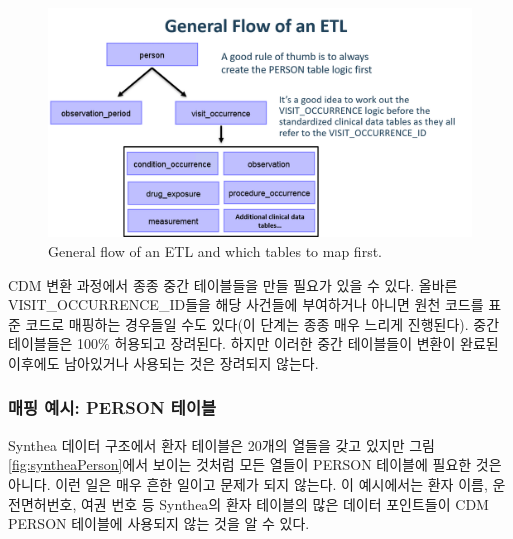 \documentclass[11pt]{book}
\theoremstyle{definition}
\theoremstyle{definition}
\theoremstyle{definition}
\theoremstyle{remark}
\begin{document}
\begin{figure}

{\centering \includegraphics[width=1\linewidth]{images/ExtractTransformLoad/flowOfEtl} 

}

\caption{General flow of an ETL and which tables to map first.}\label{fig:etlFlow}
\end{figure}

CDM 변환 과정에서 종종 중간 테이블들을 만들 필요가 있을 수 있다. 올바른
VISIT\_OCCURRENCE\_ID들을 해당 사건들에 부여하거나 아니면 원천 코드를
표준 코드로 매핑하는 경우들일 수도 있다(이 단계는 종종 매우 느리게
진행된다). 중간 테이블들은 100\% 허용되고 장려된다. 하지만 이러한 중간
테이블들이 변환이 완료된 이후에도 남아있거나 사용되는 것은 장려되지
않는다.

\subsubsection*{매핑 예시: PERSON 테이블}\label{--person-}

Synthea 데이터 구조에서 환자 테이블은 20개의 열들을 갖고 있지만 그림
\ref{fig:syntheaPerson}에서 보이는 것처럼 모든 열들이 PERSON 테이블에
필요한 것은 아니다. 이런 일은 매우 흔한 일이고 문제가 되지 않는다. 이
예시에서는 환자 이름, 운전면허번호, 여권 번호 등 Synthea의 환자 테이블의
많은 데이터 포인트들이 CDM PERSON 테이블에 사용되지 않는 것을 알 수
있다.
\end{document}
